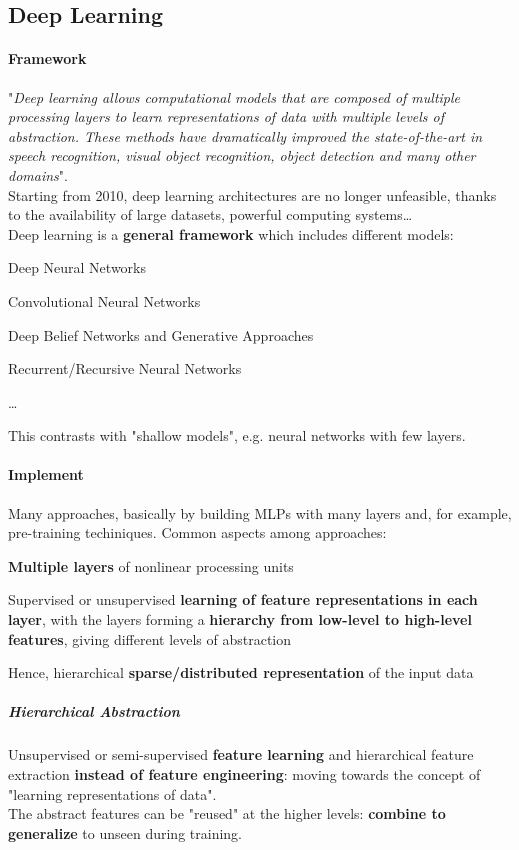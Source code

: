 \documentclass[10pt]{report}
\begin{document}
\subsection{Deep Learning}
\paragraph{Framework} "\textit{Deep learning  allows computational models that are composed of
multiple processing layers to learn representations of data with multiple levels of abstraction. These methods have dramatically improved the state-of-the-art in speech recognition, visual object recognition, object detection and many other domains}".\\
Starting from 2010, deep learning architectures are no longer unfeasible, thanks to the availability of large datasets, powerful computing systems\ldots\\
Deep learning is a \textbf{general framework} which includes different models:
\begin{list}{}{}
	\item Deep Neural Networks
	\item Convolutional Neural Networks
	\item Deep Belief Networks and Generative Approaches
	\item Recurrent/Recursive Neural Networks
	\item \ldots
\end{list}
This contrasts with "shallow models", e.g. neural networks with few layers.
\paragraph{Implement} Many approaches, basically by building MLPs with many layers and, for example, pre-training techiniques. Common aspects among approaches:
\begin{list}{}{}
	\item \textbf{Multiple layers} of nonlinear processing units
	\item Supervised or unsupervised \textbf{learning of feature representations in each layer}, with the layers forming a \textbf{hierarchy from low-level to high-level features}, giving different levels of abstraction
	\item Hence, hierarchical \textbf{sparse/distributed representation} of the input data
\end{list}
\subparagraph{Hierarchical Abstraction} Unsupervised or semi-supervised \textbf{feature learning} and hierarchical feature extraction \textbf{instead of feature engineering}: moving towards the concept of "learning representations of data".\\
The abstract features can be "reused" at the higher levels: \textbf{combine to generalize} to unseen during training.
\end{document}
